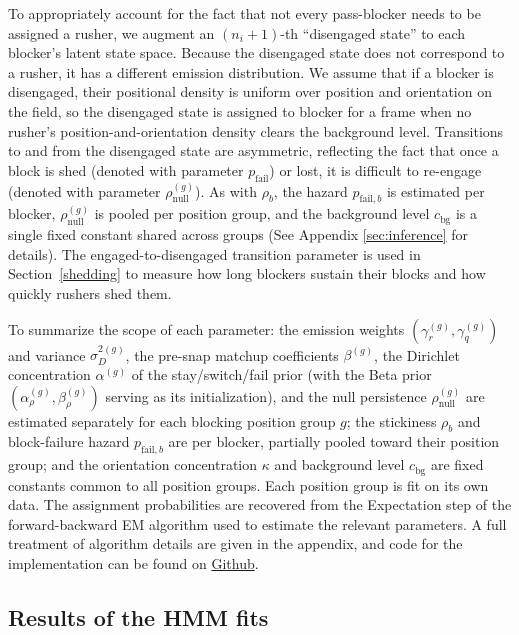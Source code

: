 \documentclass[USenglish]{article}
\let\OldSubsection\subsection
\renewcommand{\subsection}{\FloatBarrier\OldSubsection}
\theoremstyle{dgthm}
\theoremstyle{dgdef}
\begin{document}
 To appropriately account for the fact that not every pass-blocker needs to be assigned a rusher, we augment an $(n_i + 1)$-th ``disengaged state'' to each blocker's latent state space. Because the disengaged state does not correspond to a rusher, it has a different emission distribution. We assume that if a blocker is disengaged, their positional density is uniform over position and orientation on the field, so the disengaged state is assigned to blocker for a frame when no rusher's position-and-orientation density clears the background level. Transitions to and from the disengaged state are asymmetric, reflecting the fact that once a block is shed (denoted with parameter $p_{\text{fail}}$) or lost, it is difficult to re-engage (denoted with parameter $\rho^{(g)}_{\text{null}}$). As with $\rho_{b}$, the hazard $p_{\text{fail},b}$ is estimated per blocker, $\rho^{(g)}_{\text{null}}$ is pooled per position group, and the background level $c_{\text{bg}}$ is a single fixed constant shared across groups (See Appendix \ref{sec:inference} for details). The engaged-to-disengaged transition parameter is used in Section~\ref{shedding} to measure how long blockers sustain their blocks and how quickly rushers shed them.

To summarize the scope of each parameter: the emission weights $(\gamma^{(g)}_r, \gamma^{(g)}_q)$ and variance $\sigma^{2(g)}_D$, the pre-snap matchup coefficients $\beta^{(g)}$, the Dirichlet concentration $\alpha^{(g)}$ of the stay/switch/fail prior (with the Beta prior $(\alpha^{(g)}_\rho, \beta^{(g)}_\rho)$ serving as its initialization), and the null persistence $\rho^{(g)}_{\text{null}}$ are estimated separately for each blocking position group $g$; the stickiness $\rho_b$ and block-failure hazard $p_{\text{fail},b}$ are per blocker, partially pooled toward their position group; and the orientation concentration $\kappa$ and background level $c_{\text{bg}}$ are fixed constants common to all position groups. Each position group is fit on its own data. The assignment probabilities are recovered from the Expectation step of the forward-backward EM algorithm used to estimate the relevant parameters. A full treatment of algorithm details are given in the appendix, and code for the implementation can be found on \href{https://github.com/IshTheCoder/Matchup_Identifier}{Github}. 


\subsection{Results of the HMM fits}
\end{document}
